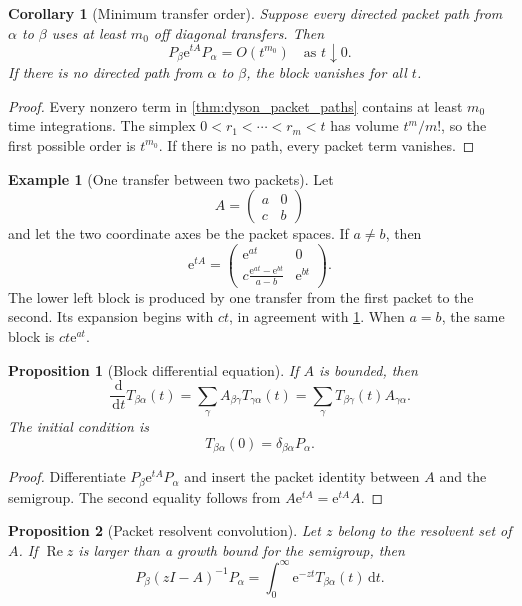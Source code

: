 \documentclass{aomart}
\newtheorem{proposition}[proposition]{Proposition}
\newtheorem{corollary}[corollary]{Corollary}
\theoremstyle{definition}
\newtheorem{example}[example]{Example}
\theoremstyle{remark}
\newcommand{\e}{\mathrm e}
\newcommand{\dd}{\,\mathrm d}
\begin{document}
\begin{corollary}[Minimum transfer order]\label{cor:minimum_transfer_order}
Suppose every directed packet path from \(\alpha\) to \(\beta\) uses at least \(m_0\) off diagonal transfers. Then
\[
P_\beta\e^{tA}P_\alpha
=O(t^{m_0})
\quad\text{as }t\downarrow0.
\]
If there is no directed path from \(\alpha\) to \(\beta\), the block vanishes for all \(t\).
\end{corollary}

\begin{proof}
Every nonzero term in \cref{thm:dyson_packet_paths} contains at least \(m_0\) time integrations. The simplex \(0<r_1<\cdots<r_m<t\) has volume \(t^m/m!\), so the first possible order is \(t^{m_0}\). If there is no path, every packet term vanishes.
\end{proof}


\begin{example}[One transfer between two packets]\label{ex:two_packet_transfer}
Let
\[
A=
\begin{pmatrix}
a&0\\
c&b
\end{pmatrix}
\]
and let the two coordinate axes be the packet spaces. If \(a\neq b\), then
\[
\e^{tA}
=
\begin{pmatrix}
\e^{at}&0\\
\displaystyle c\frac{\e^{at}-\e^{bt}}{a-b}&\e^{bt}
\end{pmatrix}.
\]
The lower left block is produced by one transfer from the first packet to the second. Its expansion begins with \(ct\), in agreement with \cref{cor:minimum_transfer_order}. When \(a=b\), the same block is \(ct\e^{at}\).
\end{example}

\begin{proposition}[Block differential equation]\label{prop:block_differential_equation}
If \(A\) is bounded, then
\[
\frac{\dd}{\dd t}T_{\beta\alpha}(t)
=
\sum_\gamma A_{\beta\gamma}T_{\gamma\alpha}(t)
=
\sum_\gamma T_{\beta\gamma}(t)A_{\gamma\alpha}.
\]
The initial condition is
\[
T_{\beta\alpha}(0)=\delta_{\beta\alpha}P_\alpha.
\]
\end{proposition}

\begin{proof}
Differentiate \(P_\beta\e^{tA}P_\alpha\) and insert the packet identity between \(A\) and the semigroup. The second equality follows from \(A\e^{tA}=\e^{tA}A\).
\end{proof}

\begin{proposition}[Packet resolvent convolution]\label{prop:packet_resolvent}
Let \(z\) belong to the resolvent set of \(A\). If \(\operatorname{Re}z\) is larger than a growth bound for the semigroup, then
\[
P_\beta(zI-A)^{-1}P_\alpha
=
\int_0^{\infty}\e^{-zt}T_{\beta\alpha}(t)\dd t.
\]
\end{proposition}
\end{document}
